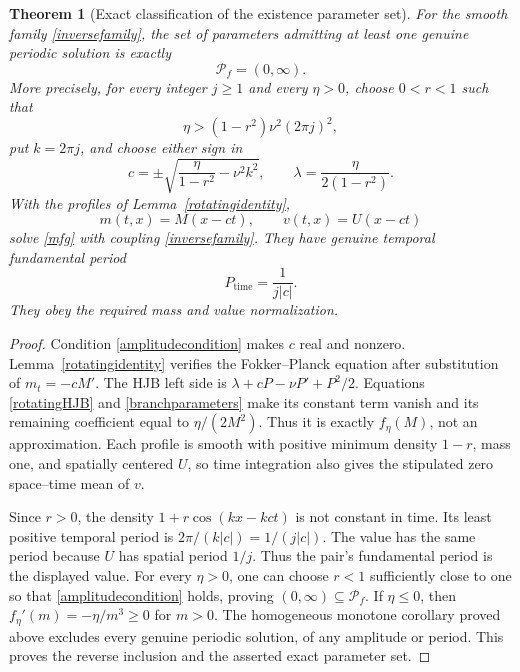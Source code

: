 \documentclass[11pt]{article}
\newtheorem{theorem}{Theorem}
\begin{document}
\begin{theorem}[Exact classification of the existence parameter set]
\label{explicitexistence}
For the smooth family \eqref{inversefamily}, the set of parameters
admitting at least one genuine periodic solution is exactly
\[
 \mathcal P_f=(0,\infty).
\]
More precisely, for every integer $j\geq1$ and every $\eta>0$, choose
$0<r<1$ such that
\begin{equation}\label{amplitudecondition}
 \eta>(1-r^2)\nu^2(2\pi j)^2,
\end{equation}
put $k=2\pi j$, and choose either sign in
\begin{equation}\label{branchparameters}
 c=\pm\sqrt{\frac{\eta}{1-r^2}-\nu^2 k^2},\qquad
 \lambda=\frac{\eta}{2(1-r^2)}.
\end{equation}
With the profiles of Lemma~\ref{rotatingidentity},
\[
 m(t,x)=M(x-ct),\qquad v(t,x)=U(x-ct)
\]
solve \eqref{mfg} with coupling \eqref{inversefamily}.
They have genuine temporal fundamental period
\begin{equation}\label{fundamentalperiod}
 P_{\mathrm{time}}=\frac1{j|c|}.
\end{equation}
They obey the required mass and value normalization.
\end{theorem}
\begin{proof}
Condition \eqref{amplitudecondition} makes $c$ real and nonzero.
Lemma~\ref{rotatingidentity} verifies the Fokker--Planck equation after
substitution of $m_t=-cM'$. The HJB left side is
$\lambda+cP-\nu P'+P^2/2$. Equations
\eqref{rotatingHJB} and \eqref{branchparameters} make its constant
term vanish and its remaining coefficient equal to $\eta/(2M^2)$.
Thus it is exactly $f_\eta(M)$, not an approximation.
Each profile is smooth with positive minimum density $1-r$, mass one,
and spatially centered $U$, so time integration also gives the stipulated
zero space--time mean of $v$.

Since $r>0$, the density $1+r\cos(kx-kct)$ is not constant in time.
Its least positive temporal period is $2\pi/(k|c|)=1/(j|c|)$.
The value has the same period because $U$ has spatial period $1/j$.
Thus the pair's fundamental period is the displayed value.
For every $\eta>0$, one can choose $r<1$ sufficiently close to one
so that \eqref{amplitudecondition} holds, proving
$(0,\infty)\subseteq\mathcal P_f$.
If $\eta\leq0$, then $f_\eta'(m)=-\eta/m^3\geq0$ for $m>0$.
The homogeneous monotone corollary proved above excludes every genuine
periodic solution, of any amplitude or period. This proves the reverse
inclusion and the asserted exact parameter set.
\end{proof}
\end{document}
